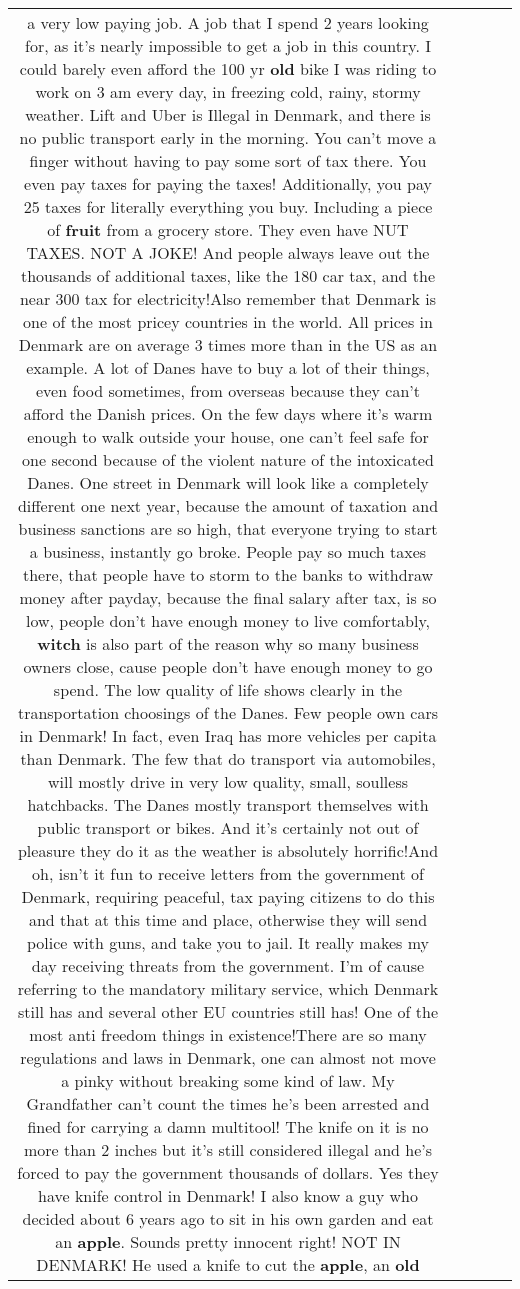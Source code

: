 \documentclass[11pt]{article}
\newlength\mylength
\begin{document}
\begin{center}
\begin{longtable}{|C{.65\mylength}|C{.30\mylength}|C{.12\mylength}|C{.12\mylength}|C{.12\mylength}|}
a very low paying job. A job that I spend 2 years looking for, as it's nearly impossible to get a job in this country. I could barely even afford the 100 yr \textbf{old} bike I was riding to work on 3 am every day, in freezing cold, rainy, stormy weather. Lift and Uber is Illegal in Denmark, and there is no public transport early in the morning. You can't move a finger without having to pay some sort of tax there. You even pay taxes for paying the taxes! Additionally, you pay 25 taxes for literally everything you buy. Including a piece of \textbf{fruit} from a grocery store. They even have NUT TAXES. NOT A JOKE! And people always leave out the thousands of additional taxes, like the 180 car tax, and the near 300 tax for electricity!Also remember that Denmark is one of the most pricey countries in the world. All prices in Denmark are on average 3 times more than in the US as an example. A lot of Danes have to buy a lot of their things, even food sometimes, from overseas because they can't afford the Danish prices.  On the few days where it's warm enough to walk outside your house, one can't feel safe for one second because of the violent nature of the intoxicated Danes. One street in Denmark will look like a completely different one next year, because the amount of taxation and business sanctions are so high, that everyone trying to start a business, instantly go broke. People pay so much taxes there, that people have to storm to the banks to withdraw money after payday, because the final salary after tax, is so low, people don't have enough money to live comfortably, \textbf{witch} is also part of the reason why so many business owners close, cause people don't have enough money to go spend. The low quality of life shows clearly in the transportation choosings of the Danes. Few people own cars in Denmark! In fact, even Iraq has more vehicles per capita than Denmark. The few that do transport via automobiles, will mostly drive in very low quality, small, soulless hatchbacks. The Danes mostly transport themselves with public transport or bikes. And it's certainly not out of pleasure they do it as the weather is absolutely horrific!And oh, isn't it fun to receive letters from the government of Denmark, requiring peaceful, tax paying citizens to do this and that at this time and place, otherwise they will send police with guns, and take you to jail. It really makes my day receiving threats from the government. I'm of cause referring to the mandatory military service, which Denmark still has and several other EU countries still has! One of the most anti freedom things in existence!There are so many regulations and laws in Denmark, one can almost not move a pinky without breaking some kind of law. My Grandfather can't count the times he's been arrested and fined for carrying a damn multitool! The knife on it is no more than 2 inches but it's still considered illegal and he's forced to pay the government thousands of dollars. Yes they have knife control in Denmark! I also know a guy who decided about 6 years ago to sit in his own garden and eat an \textbf{apple}. Sounds pretty innocent right! NOT IN DENMARK! He used a knife to cut the \textbf{apple}, an \textbf{old} 
\end{longtable}
\end{center}
\end{document}

